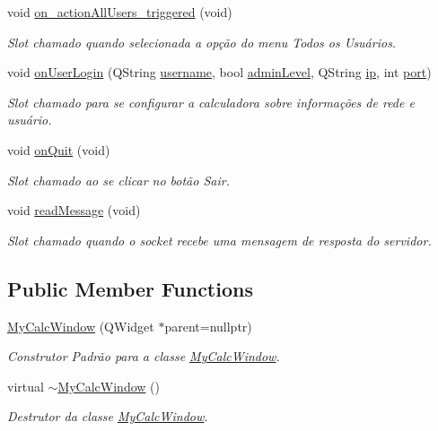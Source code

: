\begin{DoxyCompactItemize}
void \hyperlink{classMyCalcWindow_ab50a651bb1983993008960ad39d93ed6}{on\+\_\+action\+All\+Users\+\_\+triggered} (void)
\begin{DoxyCompactList}\small\item\em Slot chamado quando selecionada a opção do menu \textquotesingle{}Todos os Usuários\textquotesingle{}. \end{DoxyCompactList}\item 
void \hyperlink{classMyCalcWindow_a35f3b06bb33f0dbbfb238e6944f31074}{on\+User\+Login} (Q\+String \hyperlink{classMyCalcWindow_aaa828b24dd233138d200de623762e95c}{username}, bool \hyperlink{classMyCalcWindow_a80f22185e35ea4a28825b0d2518df67c}{admin\+Level}, Q\+String \hyperlink{classMyCalcWindow_a9b84a818b4419182b414bfa93cfe9d66}{ip}, int \hyperlink{classMyCalcWindow_a48dd1d98f83d224a788c8592929cd6a5}{port})
\begin{DoxyCompactList}\small\item\em Slot chamado para se configurar a calculadora sobre informações de rede e usuário. \end{DoxyCompactList}\item 
void \hyperlink{classMyCalcWindow_a809b1da213d1424ba098c1f0ee2d0bd5}{on\+Quit} (void)\hypertarget{classMyCalcWindow_a809b1da213d1424ba098c1f0ee2d0bd5}{}\label{classMyCalcWindow_a809b1da213d1424ba098c1f0ee2d0bd5}

\begin{DoxyCompactList}\small\item\em Slot chamado ao se clicar no botão \textquotesingle{}Sair\textquotesingle{}. \end{DoxyCompactList}\item 
void \hyperlink{classMyCalcWindow_ab8fe7eab3aa5ef91d8d54a32cbc4ecf5}{read\+Message} (void)
\begin{DoxyCompactList}\small\item\em Slot chamado quando o socket recebe uma mensagem de resposta do servidor. \end{DoxyCompactList}\end{DoxyCompactItemize}
\subsection*{Public Member Functions}
\begin{DoxyCompactItemize}
\item 
\hyperlink{classMyCalcWindow_ac205ab2dbfbf802859774a090b066518}{My\+Calc\+Window} (Q\+Widget $\ast$parent=nullptr)
\begin{DoxyCompactList}\small\item\em Construtor Padrão para a classe \hyperlink{classMyCalcWindow}{My\+Calc\+Window}. \end{DoxyCompactList}\item 
virtual \hyperlink{classMyCalcWindow_a6226362b86860c067418d16b7da1e1e2}{$\sim$\+My\+Calc\+Window} ()
\begin{DoxyCompactList}\small\item\em Destrutor da classe \hyperlink{classMyCalcWindow}{My\+Calc\+Window}. \end{DoxyCompactList}\end{DoxyCompactItemize}
